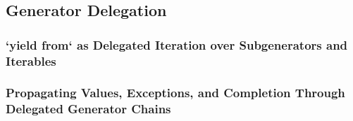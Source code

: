 \subsection{Generator Delegation}
\subsubsection{`yield from` as Delegated Iteration over Subgenerators and Iterables}
\subsubsection{Propagating Values, Exceptions, and Completion Through Delegated Generator Chains}
